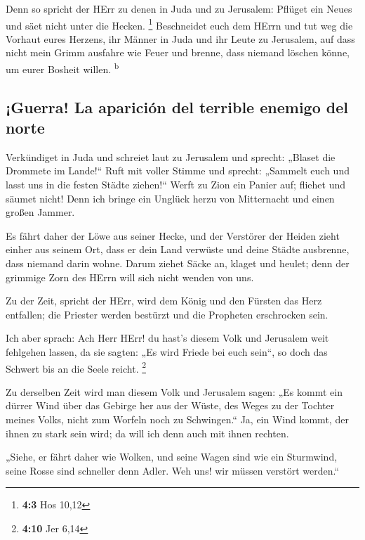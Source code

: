  Denn so spricht der HErr zu denen in Juda und zu
Jerusalem: Pflüget ein Neues und säet nicht unter die Hecken.
\footnote{\textbf{4:3} Hos 10,12}  Beschneidet euch dem
HErrn und tut weg die Vorhaut eures Herzens, ihr Männer in Juda und ihr
Leute zu Jerusalem, auf dass nicht mein Grimm ausfahre wie Feuer und
brenne, dass niemand löschen könne, um eurer Bosheit willen.
\textsuperscript{b}

\hypertarget{guerra-la-apariciuxf3n-del-terrible-enemigo-del-norte}{%
\subsection{¡Guerra! La aparición del terrible enemigo del
norte}\label{guerra-la-apariciuxf3n-del-terrible-enemigo-del-norte}}

 Verkündiget in Juda und schreiet laut zu Jerusalem und
sprecht: „Blaset die Drommete im Lande!{}`` Ruft mit voller Stimme und
sprecht: „Sammelt euch und lasst uns in die festen Städte ziehen!{}``
 Werft zu Zion ein Panier auf; fliehet und säumet nicht!
Denn ich bringe ein Unglück herzu von Mitternacht und einen großen
Jammer.

 Es fährt daher der Löwe aus seiner Hecke, und der
Verstörer der Heiden zieht einher aus seinem Ort, dass er dein Land
verwüste und deine Städte ausbrenne, dass niemand darin wohne.
 Darum ziehet Säcke an, klaget und heulet; denn der
grimmige Zorn des HErrn will sich nicht wenden von uns.

 Zu der Zeit, spricht der HErr, wird dem König und den
Fürsten das Herz entfallen; die Priester werden bestürzt und die
Propheten erschrocken sein.

 Ich aber sprach: Ach Herr HErr! du hast's diesem Volk
und Jerusalem weit fehlgehen lassen, da sie sagten: „Es wird Friede bei
euch sein``, so doch das Schwert bis an die Seele reicht. \footnote{\textbf{4:10}
  Jer 6,14}

 Zu derselben Zeit wird man diesem Volk und Jerusalem
sagen: „Es kommt ein dürrer Wind über das Gebirge her aus der Wüste, des
Weges zu der Tochter meines Volks, nicht zum Worfeln noch zu
Schwingen.``  Ja, ein Wind kommt, der ihnen zu stark sein
wird; da will ich denn auch mit ihnen rechten.

 „Siehe, er fährt daher wie Wolken, und seine Wagen sind
wie ein Sturmwind, seine Rosse sind schneller denn Adler. Weh uns! wir
müssen verstört werden.``

